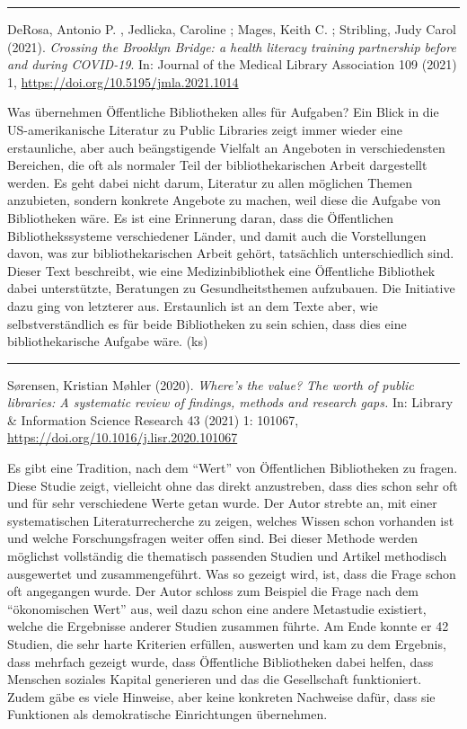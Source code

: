 \documentclass[a4paper,
fontsize=11pt,
oneside,
numbers=noperiodatend,
parskip=half-,
bibliography=totoc,
final
]{scrartcl}
\begin{document}
\begin{center}\rule{0.5\linewidth}{0.5pt}\end{center}

DeRosa, Antonio P. , Jedlicka, Caroline ; Mages, Keith C. ; Stribling,
Judy Carol (2021). \emph{Crossing the Brooklyn Bridge: a health literacy
training partnership before and during COVID-19}. In: Journal of the
Medical Library Association 109 (2021) 1,
\url{https://doi.org/10.5195/jmla.2021.1014}

Was übernehmen Öffentliche Bibliotheken alles für Aufgaben? Ein Blick in
die US-amerikanische Literatur zu Public Libraries zeigt immer wieder
eine erstaunliche, aber auch beängstigende Vielfalt an Angeboten in
verschiedensten Bereichen, die oft als normaler Teil der
bibliothekarischen Arbeit dargestellt werden. Es geht dabei nicht darum,
Literatur zu allen möglichen Themen anzubieten, sondern konkrete
Angebote zu machen, weil diese die Aufgabe von Bibliotheken wäre. Es ist
eine Erinnerung daran, dass die Öffentlichen Bibliothekssysteme
verschiedener Länder, und damit auch die Vorstellungen davon, was zur
bibliothekarischen Arbeit gehört, tatsächlich unterschiedlich sind.
Dieser Text beschreibt, wie eine Medizinbibliothek eine Öffentliche
Bibliothek dabei unterstützte, Beratungen zu Gesundheitsthemen
aufzubauen. Die Initiative dazu ging von letzterer aus. Erstaunlich ist
an dem Texte aber, wie selbstverständlich es für beide Bibliotheken zu
sein schien, dass dies eine bibliothekarische Aufgabe wäre. (ks)

\begin{center}\rule{0.5\linewidth}{0.5pt}\end{center}

Sørensen, Kristian Møhler (2020). \emph{Where's the value? The worth of
public libraries: A systematic review of findings, methods and research
gaps.} In: Library \& Information Science Research 43 (2021) 1: 101067,
\url{https://doi.org/10.1016/j.lisr.2020.101067}

Es gibt eine Tradition, nach dem \enquote{Wert} von Öffentlichen
Bibliotheken zu fragen. Diese Studie zeigt, vielleicht ohne das direkt
anzustreben, dass dies schon sehr oft und für sehr verschiedene Werte
getan wurde. Der Autor strebte an, mit einer systematischen
Literaturrecherche zu zeigen, welches Wissen schon vorhanden ist und
welche Forschungsfragen weiter offen sind. Bei dieser Methode werden
möglichst vollständig die thematisch passenden Studien und Artikel
methodisch ausgewertet und zusammengeführt. Was so gezeigt wird, ist,
dass die Frage schon oft angegangen wurde. Der Autor schloss zum
Beispiel die Frage nach dem \enquote{ökonomischen Wert} aus, weil dazu
schon eine andere Metastudie existiert, welche die Ergebnisse anderer
Studien zusammen führte. Am Ende konnte er 42 Studien, die sehr harte
Kriterien erfüllen, auswerten und kam zu dem Ergebnis, dass mehrfach
gezeigt wurde, dass Öffentliche Bibliotheken dabei helfen, dass Menschen
soziales Kapital generieren und das die Gesellschaft funktioniert. Zudem
gäbe es viele Hinweise, aber keine konkreten Nachweise dafür, dass sie
Funktionen als demokratische Einrichtungen übernehmen.
\end{document}
